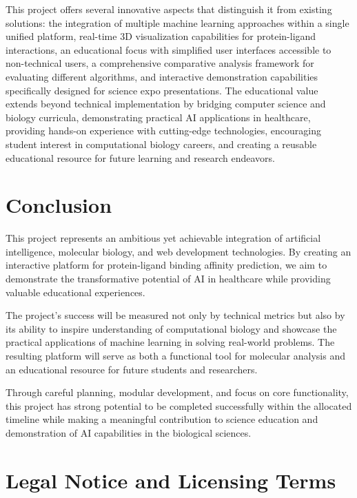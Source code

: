 \documentclass[12pt,a4paper]{article}
\begin{document}
This project offers several innovative aspects that distinguish it from existing solutions: the integration of multiple machine learning approaches within a single unified platform, real-time 3D visualization capabilities for protein-ligand interactions, an educational focus with simplified user interfaces accessible to non-technical users, a comprehensive comparative analysis framework for evaluating different algorithms, and interactive demonstration capabilities specifically designed for science expo presentations. The educational value extends beyond technical implementation by bridging computer science and biology curricula, demonstrating practical AI applications in healthcare, providing hands-on experience with cutting-edge technologies, encouraging student interest in computational biology careers, and creating a reusable educational resource for future learning and research endeavors.

\section{Conclusion}

This project represents an ambitious yet achievable integration of artificial intelligence, molecular biology, and web development technologies. By creating an interactive platform for protein-ligand binding affinity prediction, we aim to demonstrate the transformative potential of AI in healthcare while providing valuable educational experiences.

The project's success will be measured not only by technical metrics but also by its ability to inspire understanding of computational biology and showcase the practical applications of machine learning in solving real-world problems. The resulting platform will serve as both a functional tool for molecular analysis and an educational resource for future students and researchers.

Through careful planning, modular development, and focus on core functionality, this project has strong potential to be completed successfully within the allocated timeline while making a meaningful contribution to science education and demonstration of AI capabilities in the biological sciences.

\vspace{1cm}

\section*{Legal Notice and Licensing Terms}
\end{document}
